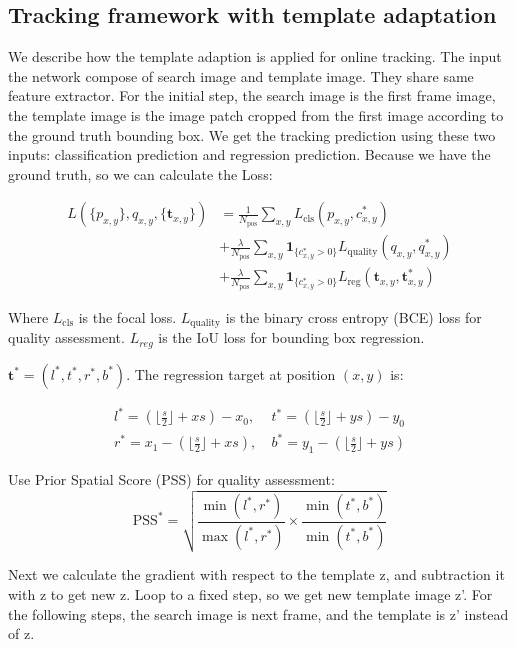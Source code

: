 \documentclass[journal]{IEEEtran}
\begin{document}
\subsection{Tracking framework with template adaptation}
We describe how the template adaption is applied for online tracking.
The input the network compose of search image and template image.
They share same feature extractor.
For the initial step, the search image is the first frame image, the template image is the image patch cropped from the first image according to the ground truth bounding box.
We get the tracking prediction using these two inputs: classification prediction and regression prediction.
Because we have the ground truth, so we can calculate the Loss:

\begin{equation}
\begin{split}
L(\{p_{x,y}\},q_{x,y},\{\pmb t_{x,y}\}) &= \frac{1}{N_{\text{pos}}}\sum_{x,y}L_{\text{cls}}(p_{x,y},c^*_{x,y})\\
&+\frac{\lambda}{N_{\text{pos}}}\sum_{x,y}\pmb1_{\{c^*_{x,y}>0\}}L_{\text{quality}}(q_{x,y},q^*_{{x,y}})\\
&+\frac{\lambda}{N_{\text{pos}}}\sum_{x,y}\pmb1_{\{c^*_{x,y}>0\}}L_{\text{reg}}(\pmb t_{x,y},\pmb t^*_{{x,y}})
\end{split}
\end{equation}

Where $L_{\text{cls}}$ is the focal loss. $L_{\text{quality}}$ is the binary cross entropy (BCE) loss for quality assessment. $L_{reg}$ is the IoU loss for bounding box regression.

$\pmb t^*=(l^*,t^*,r^*,b^*)$. The regression target at position $(x,y)$ is: 

\begin{equation}
\begin{split}
l^*=(\lfloor\frac{s}{2}\rfloor+xs)-x_0,\   &t^*=(\lfloor\frac{s}{2}\rfloor+ys)-y_0\\
r^*=x_1-(\lfloor\frac{s}{2}\rfloor+xs),\   &b^*=y_1-(\lfloor\frac{s}{2}\rfloor+ys)
\end{split}
\end{equation}

Use Prior Spatial Score (PSS) for quality assessment:
\begin{equation}
\text{PSS}^* = \sqrt{\frac{\min(l^*,r^*)}{\max(l^*,r^*)}\times\frac{\min(t^*,b^*)}{\min(t^*,b^*)}}
\end{equation}

Next we calculate the gradient with respect to the template z, and subtraction it with z to get new z.
Loop to a fixed step, so we get new template image z'.
For the following steps, the search image is next frame, and the template is z' instead of z.
\end{document}

